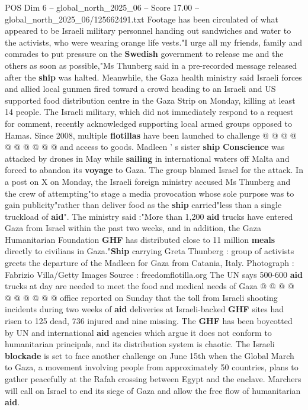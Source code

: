 \begin{textsample}{POS Dim 6 – global\_north\_2025\_06 – Score 17.00 – global\_north\_2025\_06/125662491.txt}
Footage has been circulated of what appeared to be Israeli military personnel handing out sandwiches and water to the activists, who were wearing orange life vests."I urge all my friends, family and comrades to put pressure on the \textbf{Swedish} government to release me and the others as soon as possible,"Ms Thunberg said in a pre-recorded message released after the \textbf{ship} was halted.
Meanwhile, the Gaza health ministry said Israeli forces and allied local gunmen fired toward a crowd heading to an Israeli and US supported food distribution centre in the Gaza Strip on Monday, killing at least 14 people.
The Israeli military, which did not immediately respond to a request for comment, recently acknowledged supporting local armed groups opposed to Hamas.
Since 2008, multiple \textbf{flotillas} have been launched to challenge @ @ @ @ @ @ @ @ @ @ and access to goods.
Madleen ' s sister \textbf{ship} \textbf{Conscience} was attacked by drones in May while \textbf{sailing} in international waters off Malta and forced to abandon its \textbf{voyage} to Gaza.
The group blamed Israel for the attack.
In a post on X on Monday, the Israeli foreign ministry accused Ms Thunberg and the crew of attempting"to stage a media provocation whose sole purpose was to gain publicity"rather than deliver food as the \textbf{ship} carried"less than a single truckload of \textbf{aid}".
The ministry said :"More than 1,200 \textbf{aid} trucks have entered Gaza from Israel within the past two weeks, and in addition, the Gaza Humanitarian Foundation \textbf{GHF} has distributed close to 11 million \textbf{meals} directly to civilians in Gaza."\textbf{Ship} carrying Greta Thunberg : group of activists greets the departure of the Madleen for Gaza from Catania, Italy.
Photograph : Fabrizio Villa/Getty Images Source : freedomflotilla.org The UN says 500-600 \textbf{aid} trucks at day are needed to meet the food and medical needs of Gaza @ @ @ @ @ @ @ @ @ @ office reported on Sunday that the toll from Israeli shooting incidents during two weeks of \textbf{aid} deliveries at Israeli-backed \textbf{GHF} sites had risen to 125 dead, 736 injured and nine missing.
The \textbf{GHF} has been boycotted by UN and international \textbf{aid} agencies which argue it does not conform to humanitarian principals, and its distribution system is chaotic.
The Israeli \textbf{blockade} is set to face another challenge on June 15th when the Global March to Gaza, a movement involving people from approximately 50 countries, plans to gather peacefully at the Rafah crossing between Egypt and the enclave.
Marchers will call on Israel to end its siege of Gaza and allow the free flow of humanitarian \textbf{aid}.

\end{textsample}
